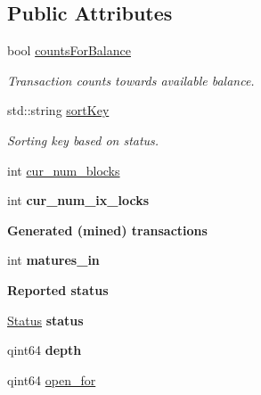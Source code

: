 \subsection*{Public Attributes}
\begin{DoxyCompactItemize}
\item 
\mbox{\label{class_transaction_status_a052ab3e47ca113a3e921f069723b8601}} 
bool \mbox{\hyperlink{class_transaction_status_a052ab3e47ca113a3e921f069723b8601}{counts\+For\+Balance}}
\begin{DoxyCompactList}\small\item\em Transaction counts towards available balance. \end{DoxyCompactList}\item 
\mbox{\label{class_transaction_status_afb31544f313d0630a41e376417233d68}} 
std\+::string \mbox{\hyperlink{class_transaction_status_afb31544f313d0630a41e376417233d68}{sort\+Key}}
\begin{DoxyCompactList}\small\item\em Sorting key based on status. \end{DoxyCompactList}\item 
int \mbox{\hyperlink{class_transaction_status_a22839cc23993e849a6c9fed8bffd5f50}{cur\+\_\+num\+\_\+blocks}}
\item 
\mbox{\label{class_transaction_status_a5dd91f2741963d7e68990fdf5f33c2da}} 
int {\bfseries cur\+\_\+num\+\_\+ix\+\_\+locks}
\end{DoxyCompactItemize}
\begin{Indent}\textbf{ Generated (mined) transactions}\par
\begin{DoxyCompactItemize}
\item 
\mbox{\label{class_transaction_status_a6714606658df9486e4a3f8f2be5d28b4}} 
int {\bfseries matures\+\_\+in}
\end{DoxyCompactItemize}
\end{Indent}
\begin{Indent}\textbf{ Reported status}\par
\begin{DoxyCompactItemize}
\item 
\mbox{\label{class_transaction_status_aa7d0dbec0880ccd8539d7e332f847451}} 
\mbox{\hyperlink{class_transaction_status_aaa6cc19ca3509bbae72d0df1661f85cb}{Status}} {\bfseries status}
\item 
\mbox{\label{class_transaction_status_ac8a3bd9c1ad3969c6f969418fcffa0ca}} 
qint64 {\bfseries depth}
\item 
qint64 \mbox{\hyperlink{class_transaction_status_a861ed66c0fd49440bc1aacab5315a938}{open\+\_\+for}}
\end{DoxyCompactItemize}
\end{Indent}


